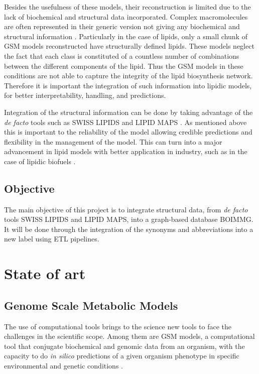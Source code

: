 \documentclass{llncs}
\begin{document}
Besides the usefulness of these models, their reconstruction is limited due to the lack of biochemical and structural data incorporated.
Complex macromolecules are often represented in their generic version not giving any biochemical and structural information \cite{Gu2019}.
Particularly in the case of lipids, only a small chunk of GSM models reconstructed have structurally defined lipids. 
These models neglect the fact that each class is constituted of a countless number of combinations between the different components of the lipid. 
Thus the GSM models in these conditions are not able to capture the integrity of the lipid biosynthesis network.
Therefore it is important the integration of such information into lipidic models, for better interpretability, handling, and predictions.

Integration of the structural information can be done by taking advantage of the  \emph{de facto} tools such as SWISS LIPIDS \cite{Aimo2015} and  LIPID MAPS \cite{Sud2007}.
As mentioned above this is important to the reliability of the model allowing credible predictions and flexibility in the management of the model.
This can turn into a major advancement in lipid models with better application in industry, such as in the case of lipidic biofuels \cite{Sawangkeaw2013}.




\subsection{Objective}

The main objective of this project is to integrate structural data, from \emph{de facto} tools SWISS LIPIDS and LIPID MAPS, into a graph-based database BOIMMG.
It will be done through the integration of the synonyms and abbreviations into a new label using ETL pipelines. 

\section{State of art}
\subsection{Genome Scale Metabolic Models}
The use of computational tools brings to the science new tools to face the challenges in the scientific scope.
Among them are GSM models, a computational tool that conjugate biochemical and genomic data from an organism, with the capacity to do \emph{in silico} predictions of a given organism phenotype in specific environmental and genetic conditions \cite{Rocha2007,Zhou2021}.
\end{document}
